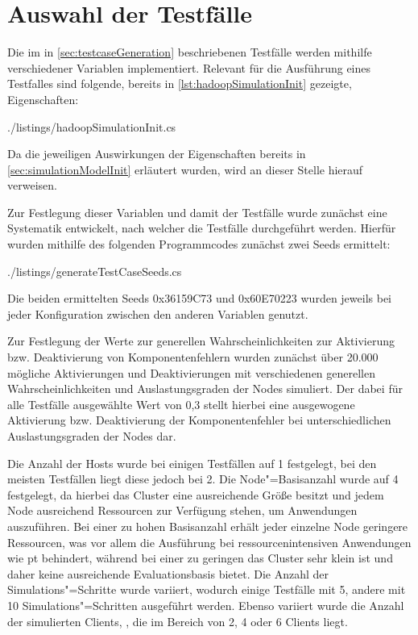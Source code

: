 \section{Auswahl der Testfälle}
\label{sec:selectTestcases}

Die im in \autoref{sec:testcaseGeneration} beschriebenen Testfälle werden mithilfe verschiedener Variablen implementiert.
Relevant für die Ausführung eines Testfalles sind folgende, bereits in \autoref{lst:hadoopSimulationInit} gezeigte, Eigenschaften:


{./listings/hadoopSimulationInit.cs}

Da die jeweiligen Auswirkungen der Eigenschaften bereits in \autoref{sec:simulationModelInit} erläutert wurden, wird an dieser Stelle hierauf verweisen.

Zur Festlegung dieser Variablen und damit der Testfälle wurde zunächst eine Systematik entwickelt, nach welcher die Testfälle durchgeführt werden.
Hierfür wurden mithilfe des folgenden Programmcodes zunächst zwei Seeds ermittelt:


{./listings/generateTestCaseSeeds.cs}

Die beiden ermittelten Seeds 0x36159C73 und 0x60E70223 wurden jeweils bei jeder Konfiguration zwischen den anderen Variablen genutzt.

Zur Festlegung der Werte zur generellen Wahrscheinlichkeiten zur Aktivierung bzw. Deaktivierung von Komponentenfehlern wurden zunächst über 20.000 mögliche Aktivierungen und Deaktivierungen mit verschiedenen generellen Wahrscheinlichkeiten und Auslastungsgraden der Nodes simuliert.
Der dabei für alle Testfälle ausgewählte Wert von 0,3 stellt hierbei eine ausgewogene Aktivierung bzw. Deaktivierung der Komponentenfehler bei unterschiedlichen Auslastungsgraden der Nodes dar.

Die Anzahl der Hosts wurde bei einigen Testfällen auf 1 festgelegt, bei den meisten Testfällen liegt diese jedoch bei 2.
Die Node"=Basisanzahl wurde auf 4 festgelegt, da hierbei das Cluster eine ausreichende Größe besitzt und jedem Node ausreichend Ressourcen zur Verfügung stehen, um Anwendungen auszuführen.
Bei einer zu hohen Basisanzahl erhält jeder einzelne Node geringere Ressourcen, was vor allem die Ausführung bei ressourcenintensiven Anwendungen wie \zB \acl{pt} behindert, während bei einer zu geringen das Cluster sehr klein ist und daher keine ausreichende Evaluationsbasis bietet.
Die Anzahl der Simulations"=Schritte wurde variiert, wodurch einige Testfälle mit 5, andere mit 10 Simulations"=Schritten ausgeführt werden.
Ebenso variiert wurde die Anzahl der simulierten Clients, , die im Bereich von 2, 4 oder 6 Clients liegt.

